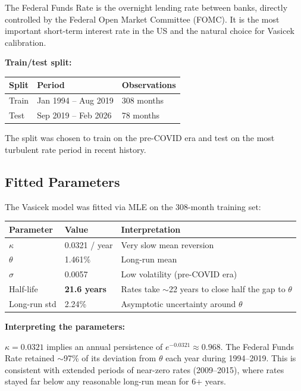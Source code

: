 \documentclass[11pt, letterpaper]{article}
\begin{document}
The Federal Funds Rate is the overnight lending rate between banks, directly
controlled by the Federal Open Market Committee (FOMC). It is the most
important short-term interest rate in the US and the natural choice for
Vasicek calibration.

\textbf{Train/test split:}

\begin{center}
\begin{tabular}{@{}lL{4cm}R{3.5cm}@{}}
  \toprule
  \textbf{Split} & \textbf{Period} & \textbf{Observations} \\
  \midrule
  Train & Jan 1994 -- Aug 2019 & 308 months \\
  Test  & Sep 2019 -- Feb 2026 & 78 months \\
  \bottomrule
\end{tabular}
\end{center}

The split was chosen to train on the pre-COVID era and test on the most
turbulent rate period in recent history.

\subsection{Fitted Parameters}

The Vasicek model was fitted via MLE on the 308-month training set:

\begin{center}
\begin{tabular}{@{}lL{3cm}L{6.5cm}@{}}
  \toprule
  \textbf{Parameter} & \textbf{Value} & \textbf{Interpretation} \\
  \midrule
  $\kappa$ & 0.0321 / year & Very slow mean reversion \\
  $\theta$ & 1.461\%       & Long-run mean \\
  $\sigma$ & 0.0057        & Low volatility (pre-COVID era) \\
  Half-life & \textbf{21.6 years} & Rates take $\sim$22 years to close half the gap to $\theta$ \\
  Long-run std & 2.24\%    & Asymptotic uncertainty around $\theta$ \\
  \bottomrule
\end{tabular}
\end{center}

\noindent\textbf{Interpreting the parameters:}

$\kappa = 0.0321$ implies an annual persistence of $e^{-0.0321} \approx 0.968$.
The Federal Funds Rate retained $\sim$97\% of its deviation from $\theta$ each
year during 1994--2019. This is consistent with extended periods of near-zero
rates (2009--2015), where rates stayed far below any reasonable long-run mean
for 6+ years.
\end{document}
